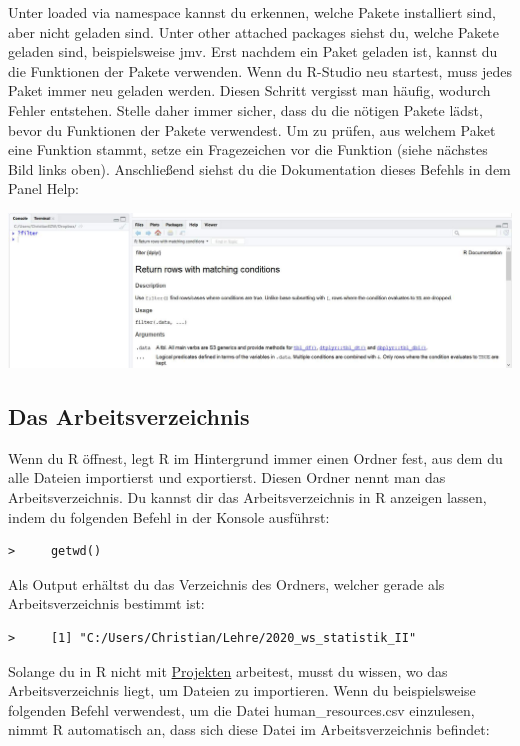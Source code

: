 \documentclass[
]{book}
\begin{document}
Unter loaded via namespace kannst du erkennen, welche Pakete installiert sind, aber nicht geladen sind. Unter other attached packages siehst du, welche Pakete geladen sind, beispielsweise jmv. Erst nachdem ein Paket geladen ist, kannst du die Funktionen der Pakete verwenden. Wenn du R-Studio neu startest, muss jedes Paket immer neu geladen werden. Diesen Schritt vergisst man häufig, wodurch Fehler entstehen. Stelle daher immer sicher, dass du die nötigen Pakete lädst, bevor du Funktionen der Pakete verwendest. Um zu prüfen, aus welchem Paket eine Funktion stammt, setze ein Fragezeichen vor die Funktion (siehe nächstes Bild links oben). Anschließend siehst du die Dokumentation dieses Befehls in dem Panel Help:

\includegraphics{images/02_grundlagen/panel_help.jpg}

\hypertarget{das-arbeitsverzeichnis}{%
\subsection{Das Arbeitsverzeichnis}\label{das-arbeitsverzeichnis}}

Wenn du R öffnest, legt R im Hintergrund immer einen Ordner fest, aus dem du alle Dateien importierst und exportierst. Diesen Ordner nennt man das Arbeitsverzeichnis. Du kannst dir das Arbeitsverzeichnis in R anzeigen lassen, indem du folgenden Befehl in der Konsole ausführst:

\begin{verbatim}
>     getwd()
\end{verbatim}

Als Output erhältst du das Verzeichnis des Ordners, welcher gerade als Arbeitsverzeichnis bestimmt ist:

\begin{verbatim}
>     [1] "C:/Users/Christian/Lehre/2020_ws_statistik_II"
\end{verbatim}

Solange du in R nicht mit \href{https://support.rstudio.com/hc/en-us/articles/200526207-Using-Projects}{Projekten} arbeitest, musst du wissen, wo das Arbeitsverzeichnis liegt, um Dateien zu importieren. Wenn du beispielsweise folgenden Befehl verwendest, um die Datei human\_resources.csv einzulesen, nimmt R automatisch an, dass sich diese Datei im Arbeitsverzeichnis befindet:
\end{document}
